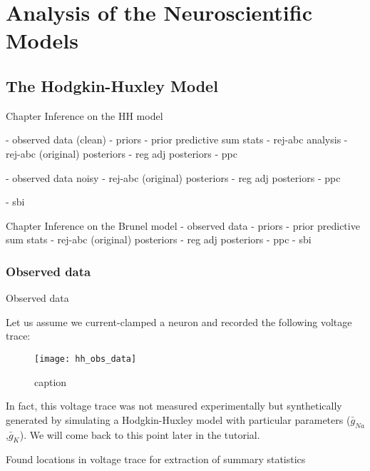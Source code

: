 \chapter{Analysis of the Neuroscientific Models}

\section{The Hodgkin-Huxley Model}

Chapter Inference on the HH model 

- observed data (clean)
- priors
- prior predictive sum stats 
- rej-abc analysis 
- rej-abc (original) posteriors 
- reg adj posteriors
- ppc 

- observed data noisy 
- rej-abc (original) posteriors 
- reg adj posteriors
- ppc 

- sbi

Chapter Inference on the Brunel model
- observed data 
- priors
- prior predictive sum stats 
- rej-abc (original) posteriors 
- reg adj posteriors
- ppc 
- sbi

\subsection{Observed data}

Observed data 

Let us assume we current-clamped a neuron and recorded the following voltage trace:

\begin{figure}[H]
    \centering
    \texttt{[image: hh\_obs\_data]}
    \caption{caption}
    \label{fig:fig1}
\end{figure} 

In fact, this voltage trace was not measured experimentally but synthetically generated by simulating a Hodgkin-Huxley model with particular parameters ($\bar g_{Na}$,$\bar g_K$). We will come back to this point later in the tutorial.

Found locations in voltage trace for extraction of summary statistics 

